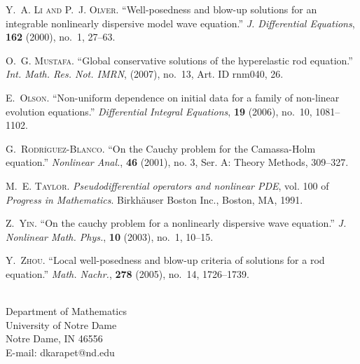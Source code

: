 \documentclass[12pt,reqno]{amsart}
\theoremstyle{plain}  %
\theoremstyle{definition}
\begin{document}
\begin{thebibliography}{10}
\textsc{Y.~A. Li and P.~J. Olver}.
\newblock \enquote{Well-posedness and blow-up solutions for an integrable
  nonlinearly dispersive model wave equation.}
\newblock \emph{J. Differential Equations}, \textbf{162} (2000), no.~1, 27--63.

\textsc{O.~G. Mustafa}.
\newblock \enquote{Global conservative solutions of the hyperelastic rod
  equation.}
\newblock \emph{Int. Math. Res. Not. IMRN},  (2007), no.~13, Art. ID rnm040,
  26.

\textsc{E.~Olson}.
\newblock \enquote{Non-uniform dependence on initial data for a family of
  non-linear evolution equations.}
\newblock \emph{Differential Integral Equations}, \textbf{19} (2006), no.~10,
  1081--1102.

\textsc{G.~Rodr{\'{\i}}guez-Blanco}.
\newblock \enquote{On the {C}auchy problem for the {C}amassa-{H}olm equation.}
\newblock \emph{Nonlinear Anal.}, \textbf{46} (2001), no. 3, Ser. A: Theory
  Methods, 309--327.

\textsc{M.~E. Taylor}.
\newblock \emph{Pseudodifferential operators and nonlinear {PDE}}, vol. 100 of
  \emph{Progress in Mathematics}.
\newblock Birkh{\"a}user Boston Inc., Boston, MA, 1991.

\textsc{Z.~Yin}.
\newblock \enquote{On the cauchy problem for a nonlinearly dispersive wave
  equation.}
\newblock \emph{J. Nonlinear Math. Phys.}, \textbf{10} (2003), no.~1, 10--15.

\textsc{Y.~Zhou}.
\newblock \enquote{Local well-posedness and blow-up criteria of solutions for a
  rod equation.}
\newblock \emph{Math. Nachr.}, \textbf{278} (2005), no.~14, 1726--1739.

\end{thebibliography}
 
  
\vskip0.1in

\\
Department of Mathematics\\
University of Notre Dame\\
Notre Dame, IN 46556\\
E-mail: dkarapet@nd.edu
\end{document}
